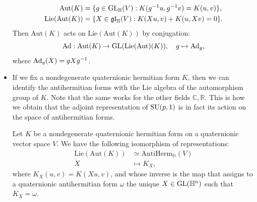 \documentclass{report}
\begin{document}
\begin{itemize}
    \begin{align*}
        \mathrm{Aut}(K) &= \{ g \in \operatorname{{\mathrm{GL}}}_\mathbb H(V) : K(g^{-1}u, g^{-1}v) = K(u,v) \},\\
        \mathrm{Lie}(\mathrm{Aut}(K)) &= \{ X \in \mathfrak{gl}_\mathbb H(V) : K(Xu, v) + K(u, Xv) = 0 \}.
    \end{align*}
    Then $\mathrm{Aut}(K)$ acts on $\mathrm{Lie}( \mathrm{Aut}(K))$ by conjugation:
    \[
    \operatorname{Ad}: \mathrm{Aut}(K) \to \operatorname{{\mathrm{GL}}}(\mathrm{Lie}(\mathrm{Aut})(K)), \quad g \mapsto \operatorname{Ad}_g,
    \]
    where $\operatorname{Ad}_g(X) = g X g^{-1}$.
    \item If we fix a nondegenerate quaternionic hermitian form $K$, then we can identify the antihermitian forms with the Lie algebra of the automorphism group of $K$.
    Note that the same works for the other fields $\mathbb C, \mathbb R$.
    This is how we obtain that the adjoint representation of $\operatorname{{\mathrm{SU}}}(p,1)$ is in fact its action on the space of antihermitian forms.
    \begin{proposition}\label{prop:antihermitian_action}
        Let $K$ be a nondegenerate quaternionic hermitian form on a quaternionic vector space $V$.    
        We have the following isomorphism of representations:
        \begin{align*}
            \mathrm{Lie}( \mathrm{Aut}(K)) &\simeq \mathrm{AntiHerm}_\mathbb H(V) \\
            X &\mapsto K_X,
        \end{align*}
        where $K_X(u,v) = K(Xu, v)$, and whose inverse is the map that assigns to a quaternionic antihermitian form $\omega$ the unique $X \in \operatorname{{\mathrm{GL}}}(\mathbb H^n)$ such that $K_X = \omega$.
    \end{proposition}
\end{itemize}
\end{document}
